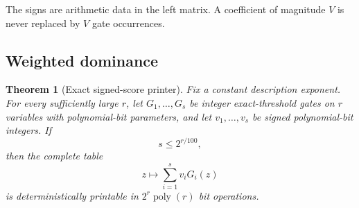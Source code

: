 \documentclass[11pt,letterpaper]{article}
\newtheorem{theorem}{Theorem}[section]
\theoremstyle{definition}
\theoremstyle{remark}
\begin{document}
The signs are arithmetic data in the left matrix. A coefficient of
magnitude \(V\) is never replaced by \(V\) gate occurrences.

\subsection{Weighted dominance}\label{b3-weighted-dominance}

\begin{theorem}[Exact signed-score printer]
\label{thm:signed-printer}
Fix a constant
description exponent. For every sufficiently large \(r\), let
\(G_1,\ldots,G_s\) be integer exact-threshold gates on \(r\) variables
with polynomial-bit parameters, and let \(v_1,\ldots,v_s\) be signed
polynomial-bit integers. If \[
s\le2^{r/100},
\] then the complete table \[
z\longmapsto\sum_{i=1}^sv_iG_i(z)
\] is deterministically printable in \(2^r\operatorname{poly}(r)\) bit
operations.
\end{theorem}
\end{document}
